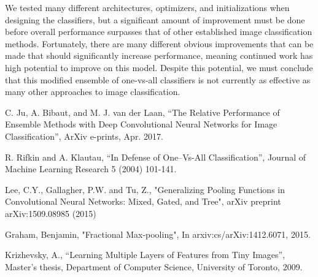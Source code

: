 \documentclass[10pt,twocolumn,letterpaper]{article}
\begin{document}
We tested many different architectures, optimizers, and initializations when designing the classifiers, but a significant amount of improvement must be done before overall performance surpasses that of other established image classification methods. Fortunately, there are many different obvious improvements that can be made that should significantly increase performance, meaning continued work has high potential to improve on this model. Despite this potential, we must conclude that this modified ensemble of one-vs-all classifiers is not currently as effective as many other approaches to image classification.


{\small
\begin{thebibliography}{9}
C. Ju, A. Bibaut, and M. J. van der Laan, “The Relative Performance of Ensemble Methods with Deep Convolutional Neural Networks for Image Classification”, ArXiv e-prints, Apr. 2017.

R. Rifkin and A. Klautau, “In Defense of One–Vs-All
Classification”, Journal of Machine Learning Research 5
(2004) 101-141.

Lee, C.Y., Gallagher, P.W. and Tu, Z., "Generalizing Pooling Functions in Convolutional Neural Networks: Mixed, Gated, and Tree", arXiv preprint arXiv:1509.08985 (2015) 

Graham, Benjamin, "Fractional Max-pooling", In arxiv:cs/arXiv:1412.6071, 2015.

Krizhevsky, A., “Learning Multiple Layers of Features from Tiny Images”, Master’s thesis, Department of Computer Science, University of Toronto, 2009.

\end{thebibliography}
}
\end{document}
